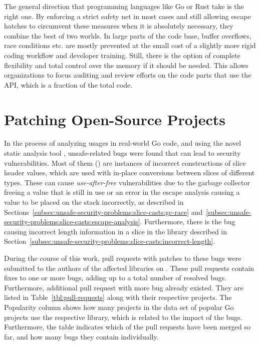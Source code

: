 The general direction that programming languages like Go or Rust take is the right one.
By enforcing a strict safety net in most cases and still allowing escape hatches to circumvent these measures when it is
absolutely necessary, they combine the best of two worlds.
In large parts of the code base, buffer overflows, race conditions etc. are mostly prevented at the small cost of a
slightly more rigid coding workflow and developer training.
Still, there is the option of complete flexibility and total control over the memory if it should be needed.
This allows organizations to focus auditing and review efforts on the code parts that use the \unsafe{} \acrshort{API},
which is a fraction of the total code.



\section{Patching Open-Source Projects}\label{sec:discussion:patches}

In the process of analyzing \unsafe{} usages in real-world Go code, and using the novel static analysis tool
\toolSafer{}, \numberBugsFixed{} unsafe-related bugs were found that can lead to security vulnerabilities.
Most of them () are instances of incorrect constructions of slice header values, which are used with
in-place conversions between slices of different types.
These can cause \textit{use-after-free} vulnerabilities due to the garbage collector freeing a value that is still
in use or an error in the escape analysis causing a value to be placed on the stack incorrectly, as described in
Sections~\ref{subsec:unsafe-security-problems:slice-casts:gc-race}
and~\ref{subsec:unsafe-security-problems:slice-casts:escape-analysis}.
Furthermore, there is the bug causing incorrect length information in a slice in the \goFuse{} library described in
Section~\ref{subsec:unsafe-security-problems:slice-casts:incorrect-length}.

During the course of this work, \numberPRs{} pull requests with patches to these bugs were submitted to the authors of
the affected libraries on \github{}.
These pull requests contain fixes to one or more bugs, adding up to a total number of  resolved
bugs.
Furthermore,  additional pull request with  more bug already existed.
They are listed in Table~\ref{tbl:pull-requests} along with their respective \github{} projects.
The Popularity column shows how many projects in the data set of popular Go projects use the respective library,
which is related to the impact of the bugs.
Furthermore, the table indicates which of the pull requests have been merged so far, and how many bugs they contain
individually.

